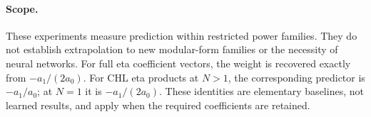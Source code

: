 \paragraph{Scope.}
These experiments measure prediction within restricted power families. They do not establish extrapolation to new modular-form families or the necessity of neural networks. For full eta coefficient vectors, the weight is recovered exactly from $-a_1/(2a_0)$. For CHL eta products at $N>1$, the corresponding predictor is $-a_1/a_0$; at $N=1$ it is $-a_1/(2a_0)$. These identities are elementary baselines, not learned results, and apply when the required coefficients are retained.
